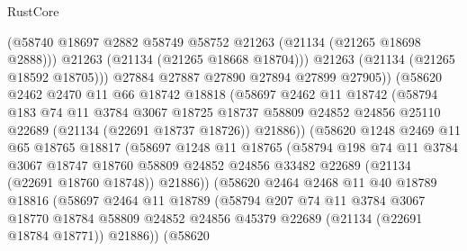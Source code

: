 \begin{lexlean}{RustCore}
\begin{coremodule}
                      (@58740 @18697 @2882 @58749 @58752 @21263 (@21134 (@21265 @18698 @2888)))
                      @21263
                      (@21134 (@21265 @18668 @18704)))
                    @21263
                    (@21134 (@21265 @18592 @18705)))
                  @27884
                  @27887
                  @27890
                  @27894
                  @27899
                  @27905))
              (@58620
                @2462
                @2470
                @11
                @66
                @18742
                @18818
                (@58697
                  @2462
                  @11
                  @18742
                  (@58794
                    @183
                    @74
                    @11
                    @3784
                    @3067
                    @18725
                    @18737
                    @58809
                    @24852
                    @24856
                    @25110
                    @22689
                    (@21134 (@22691 @18737 @18726))
                    @21886))
                (@58620
                  @1248
                  @2469
                  @11
                  @65
                  @18765
                  @18817
                  (@58697
                    @1248
                    @11
                    @18765
                    (@58794
                      @198
                      @74
                      @11
                      @3784
                      @3067
                      @18747
                      @18760
                      @58809
                      @24852
                      @24856
                      @33482
                      @22689
                      (@21134 (@22691 @18760 @18748))
                      @21886))
                  (@58620
                    @2464
                    @2468
                    @11
                    @40
                    @18789
                    @18816
                    (@58697
                      @2464
                      @11
                      @18789
                      (@58794
                        @207
                        @74
                        @11
                        @3784
                        @3067
                        @18770
                        @18784
                        @58809
                        @24852
                        @24856
                        @45379
                        @22689
                        (@21134 (@22691 @18784 @18771))
                        @21886))
                    (@58620

\end{coremodule}
\end{lexlean}
